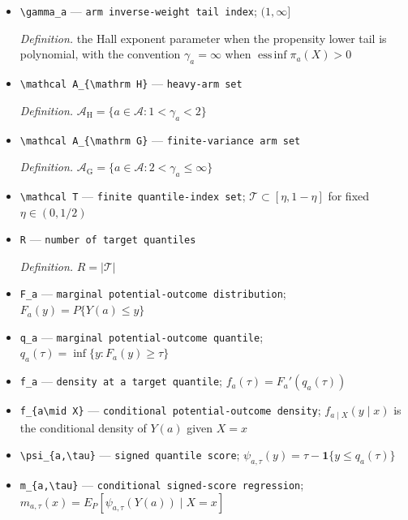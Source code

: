 \documentclass{article}
\begin{document}
\begin{itemize}
  \item \texttt{\textbackslash{}\allowbreak{}gamma\_\allowbreak{}a} --- \texttt{arm inverse-\allowbreak{}weight tail index}; \((1,\infty]\)
  \par\smallskip\noindent\emph{Definition.} the Hall exponent parameter when the propensity lower tail is polynomial, with the convention \(\gamma_a=\infty\) when \(\operatorname*{ess\,inf}\pi_a(X)>0\)
  \item \texttt{\textbackslash{}\allowbreak{}mathcal A\_\allowbreak{}\{\textbackslash{}\allowbreak{}mathrm H\}\allowbreak{}} --- \texttt{heavy-\allowbreak{}arm set}
  \par\smallskip\noindent\emph{Definition.} \(\mathcal A_{\mathrm H}=\{a\in\mathcal A:1<\gamma_a<2\}\)
  \item \texttt{\textbackslash{}\allowbreak{}mathcal A\_\allowbreak{}\{\textbackslash{}\allowbreak{}mathrm G\}\allowbreak{}} --- \texttt{finite-\allowbreak{}variance arm set}
  \par\smallskip\noindent\emph{Definition.} \(\mathcal A_{\mathrm G}=\{a\in\mathcal A:2<\gamma_a\le\infty\}\)
  \item \texttt{\textbackslash{}\allowbreak{}mathcal T} --- \texttt{finite quantile-\allowbreak{}index set}; \(\mathcal T\subset[\eta,1-\eta]\) for fixed \(\eta\in(0,1/2)\)
  \item \texttt{R} --- \texttt{number of target quantiles}
  \par\smallskip\noindent\emph{Definition.} \(R=|\mathcal T|\)
  \item \texttt{F\_\allowbreak{}a} --- \texttt{marginal potential-\allowbreak{}outcome distribution}; \(F_a(y)=P\{Y(a)\le y\}\)
  \item \texttt{q\_\allowbreak{}a} --- \texttt{marginal potential-\allowbreak{}outcome quantile}; \(q_a(\tau)=\inf\{y:F_a(y)\ge\tau\}\)
  \item \texttt{f\_\allowbreak{}a} --- \texttt{density at a target quantile}; \(f_a(\tau)=F_a'(q_a(\tau))\)
  \item \texttt{f\_\allowbreak{}\{a\textbackslash{}\allowbreak{}mid X\}\allowbreak{}} --- \texttt{conditional potential-\allowbreak{}outcome density}; \(f_{a\mid X}(y\mid x)\) is the conditional density of \(Y(a)\) given \(X=x\)
  \item \texttt{\textbackslash{}\allowbreak{}psi\_\allowbreak{}\{a,\allowbreak{}\textbackslash{}\allowbreak{}tau\}\allowbreak{}} --- \texttt{signed quantile score}; \(\psi_{a,\tau}(y)=\tau-\mathbf1\{y\le q_a(\tau)\}\)
  \item \texttt{m\_\allowbreak{}\{a,\allowbreak{}\textbackslash{}\allowbreak{}tau\}\allowbreak{}} --- \texttt{conditional signed-\allowbreak{}score regression}; \(m_{a,\tau}(x)=E_P[\psi_{a,\tau}(Y(a))\mid X=x]\)

\end{itemize}
\end{document}

